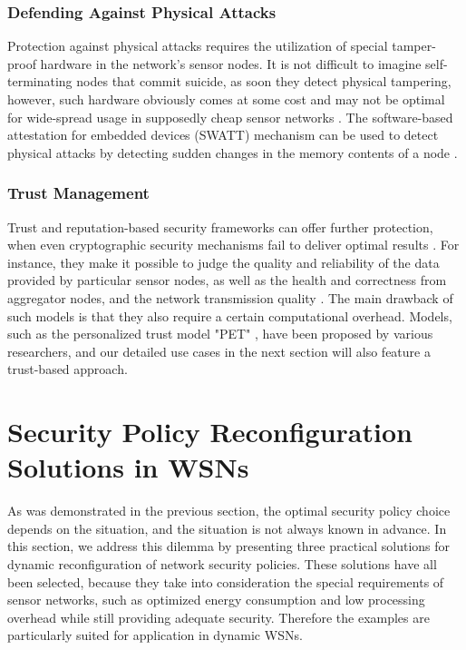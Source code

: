 \documentclass[12pt,a4paper,twoside]{report}
\begin{document}
\subsubsection{Defending Against Physical Attacks}
Protection against physical attacks requires the utilization of special tamper-proof hardware in the network's sensor nodes. It is not difficult to imagine self-terminating nodes that commit suicide, as soon they detect physical tampering, however, such hardware obviously comes at some cost and may not be optimal for wide-spread usage in supposedly cheap sensor networks \cite{sen:2009}. The software-based attestation for embedded devices (SWATT) mechanism can be used to detect physical attacks by detecting sudden changes in the memory contents of a node \cite{seshadri;etal:2004}.\par
\fi
\subsubsection{Trust Management}
Trust and reputation-based security frameworks can offer further protection, when even cryptographic security mechanisms fail to deliver optimal results \cite{sen:2009}. For instance, they make it possible to judge the quality and reliability of the data provided by particular sensor nodes, as well as the health and correctness from  aggregator nodes, and the network transmission quality \cite{sen:2009}. The main drawback of such models is that they also require a certain computational overhead. Models, such as the personalized trust model "PET" \cite{liang;shi:2005}, have been proposed by various researchers, and our detailed use cases in the next section will also feature a trust-based approach.\par
\section{Security Policy Reconfiguration Solutions in WSNs}
\label{sec:main}
As was demonstrated in the previous section, the optimal security policy choice depends on the situation, and the situation is not always known in advance. In this section, we address this dilemma by presenting three practical solutions for dynamic reconfiguration of network security policies. These solutions have all been selected, because they take into consideration the special requirements of sensor networks, such as optimized energy consumption and low processing overhead while still providing adequate security. Therefore the examples are particularly suited for application in dynamic WSNs.
\iffalse
\end{document}
